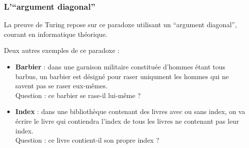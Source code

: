 \documentclass{beamer}
\begin{document}
\frame
{
\frametitle{L'``argument diagonal''}

La preuve de Turing repose sur ce paradoxe utilisant un ``argument diagonal'', courant en informatique théorique.

\vspace*{1cm}

Deux autres exemples de ce paradoxe :
\begin{itemize}
  \item \textbf{Barbier} : dans une garnison militaire constituée d'hommes étant tous barbus, un barbier est désigné pour raser uniqument les hommes qui ne savent pas se raser eux-mêmes. \\
  Question : ce barbier se rase-il lui-même ?

  \item \textbf{Index} : dans une bibliothèque contenant des livres avec ou sans index, on va écrire le livre qui contiendra l'index de tous les livres ne contenant pas leur index. \\
  Question : ce livre contient-il son propre index ?
\end{itemize}

}
\end{document}
